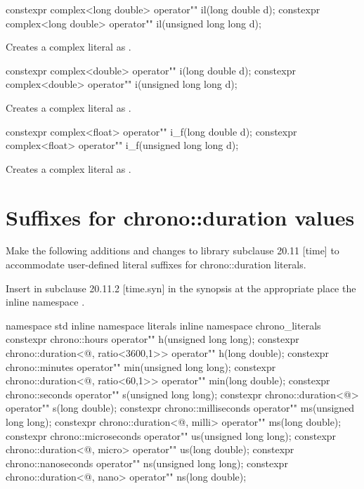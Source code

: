 \documentclass[ebook,11pt,article]{memoir}
\begin{document}
\begin{itemdecl}
constexpr complex<long double> operator"" il(long double d);
constexpr complex<long double> operator"" il(unsigned long long d);
\end{itemdecl}

\begin{itemdescr}
\pnum
\effects
Creates a complex literal as .
\end{itemdescr}

\begin{itemdecl}
constexpr complex<double> operator"" i(long double d);
constexpr complex<double> operator"" i(unsigned long long d);
\end{itemdecl}

\begin{itemdescr}
\pnum
\effects
Creates a complex literal as .
\end{itemdescr}

\begin{itemdecl}
constexpr complex<float> operator"" i_f(long double d);
constexpr complex<float> operator"" i_f(unsigned long long d);
\end{itemdecl}

\begin{itemdescr}
\pnum
\effects
Creates a complex literal as .
\end{itemdescr}


\section{Suffixes for chrono::duration values}
Make the following additions and changes to library subclause 20.11 [time] to accommodate user-defined literal suffixes for chrono::duration literals.

Insert in subclause 20.11.2 [time.syn] in the synopsis at the appropriate place the inline namespace .
\renewcommand{\unspec}{\UNSP{unspecified}}%

\begin{codeblock}
namespace std {
inline namespace literals {
inline namespace chrono_literals{
constexpr 
chrono::hours operator"" h(unsigned long long);
constexpr 
chrono::duration<@\unspec@, ratio<3600,1>> operator"" h(long double);
constexpr 
chrono::minutes operator"" min(unsigned long long);
constexpr 
chrono::duration<@\unspec@, ratio<60,1>> operator"" min(long double);
constexpr 
chrono::seconds operator"" s(unsigned long long);
constexpr 
chrono::duration<@\unspec@> operator"" s(long double);
constexpr 
chrono::milliseconds operator"" ms(unsigned long long);
constexpr 
chrono::duration<@\unspec@, milli> operator"" ms(long double);
constexpr 
chrono::microseconds operator"" us(unsigned long long);
constexpr 
chrono::duration<@\unspec@, micro> operator"" us(long double);
constexpr 
chrono::nanoseconds operator"" ns(unsigned long long);
constexpr 
chrono::duration<@\unspec@, nano> operator"" ns(long double);
}}}
\end{codeblock}
\end{document}
